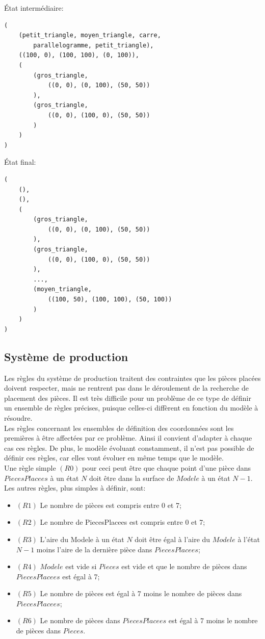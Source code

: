 \documentclass[a4paper, 11pt]{report}
\begin{document}
État intermédiaire:\\
\begin{verbatim}
(
	(petit_triangle, moyen_triangle, carre,					
		parallelogramme, petit_triangle), 
	((100, 0), (100, 100), (0, 100)),							   
	(														
		(gros_triangle, 
			((0, 0), (0, 100), (50, 50))
		),
		(gros_triangle, 
			((0, 0), (100, 0), (50, 50))
		)
	)
)
\end{verbatim}


État final:\\
\begin{verbatim}
(
	(),														
	(),														
	(													   
		(gros_triangle,
			((0, 0), (0, 100), (50, 50))
		),
		(gros_triangle, 
			((0, 0), (100, 0), (50, 50))
		),
		...,
		(moyen_triangle,
			((100, 50), (100, 100), (50, 100))
		)
	)
)
\end{verbatim}

			\subsection{Système de production}

		Les règles du système de production traitent des contraintes que les pièces placées doivent respecter, mais ne rentrent pas dans le déroulement de la recherche de placement des pièces. Il est très difficile pour un problème de ce type de définir un ensemble de règles précises, puisque celles-ci diffèrent en fonction du modèle à résoudre.\\
		Les règles concernant les ensembles de définition des coordonnées sont les premières à être affectées par ce problème. Ainsi il convient d'adapter à chaque cas ces règles. De plus, le modèle évoluant constamment, il n'est pas possible de définir ces règles, car elles vont évoluer en même temps que le modèle. \\
Une règle simple $(R0)$ pour ceci peut être que chaque point d'une pièce dans $PiecesPlacees$ à un état $N$ doit
être dans la surface de $Modele$ à un état $N-1$.\\

Les autres règles, plus simples à définir, sont:
	\begin{itemize}
		\item $(R1)$ Le nombre de pièces est compris entre 0 et 7;
		\item $(R2)$ Le nombre de PiecesPlacees est compris entre 0 et 7;
		\item $(R3)$ L'aire du Modele à un état $N$ doit être égal à l'aire du $Modele$ à
l'état $N-1$ moins l'aire de la dernière pièce dans $PiecesPlacees$;
		\item $(R4)$ $Modele$ est vide si $Pieces$ est vide et que le nombre de pièces dans $PiecesPlacees$
est égal à 7;
		\item $(R5)$ Le nombre de pièces est égal à 7 moins le nombre de pièces dans $PiecesPlacees$;
		\item $(R6)$ Le nombre de pièces dans $PiecesPlacees$ est égal à 7 moins le nombre de pièces dans $Pieces$.
	\end{itemize}
	
\end{document}
